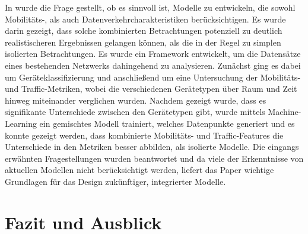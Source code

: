\documentclass[12pt, a4paper]{article}
\begin{document}
In \cite{Alipour2018} wurde die Frage gestellt, ob es sinnvoll ist, Modelle zu entwickeln, die sowohl
Mobilitäts-, als auch Datenverkehrcharakteristiken berücksichtigen. Es wurde darin gezeigt, dass solche
kombinierten Betrachtungen potenziell zu deutlich realistischeren Ergebnissen gelangen können,
als die in der Regel zu simplen isolierten Betrachtungen.
Es wurde ein Framework entwickelt, um die Datensätze eines bestehenden Netzwerks dahingehend zu analysieren.
Zunächst ging es dabei um Geräteklassifizierung und anschließend um eine Untersuchung der Mobilitäts-
und Traffic-Metriken, wobei die verschiedenen Gerätetypen über Raum und Zeit hinweg miteinander verglichen wurden.
Nachdem gezeigt wurde, dass es signifikante Unterschiede zwischen den Gerätetypen gibt,
wurde mittels Machine-Learning ein gemischtes Modell trainiert, welches Datenpunkte generiert
und es konnte gezeigt werden, dass kombinierte Mobilitäts- und Traffic-Features die Unterschiede in den
Metriken besser abbilden, als isolierte Modelle. Die eingangs erwähnten Fragestellungen wurden beantwortet
und da viele der Erkenntnisse von aktuellen Modellen nicht berücksichtigt werden, liefert
das Paper wichtige Grundlagen für das Design zukünftiger, integrierter Modelle.

\section{Fazit und Ausblick}
\label{sec:conclusion}
\end{document}
